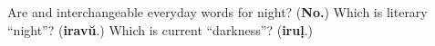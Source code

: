 \begin{tcolorbox}[breakable,colback=teal!4,colframe=teal!35!black,title={Before you move on}]
Are \textbf{} and \textbf{} interchangeable everyday words for night? (\textbf{No.}) Which is literary “night”? (\textbf{iravŭ}.) Which is current “darkness”? (\textbf{iruḷ}.)
\end{tcolorbox}
